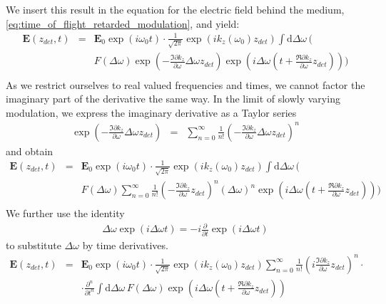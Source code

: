 \documentclass[12pt,a4paper,twoside,openright,BCOR10mm,headsepline,titlepage,abstracton,chapterprefix,final]{scrreprt}
\newcommand\Vector[1]{{\mathbf{#1}}}
\newcommand\wavenumber{k}
\newcommand\scalarEfield{E}
\newcommand\Efield{\Vector{\scalarEfield}}
\newcommand\totald{\textrm{d}}
\begin{document}
We insert this result in the equation for the electric field behind the medium, \eqref{eq:time_of_flight_retarded_modulation}, and yield:
\begin{eqnarray}
\Efield(z_{det}, t) &=& 
  \Efield_0 \exp ( i \omega_0 t)
  \cdot
     \frac{1}{\sqrt{2\pi}} \exp (i \wavenumber_z(\omega_0) z_{det})
     \int \totald\Delta\omega\,
     \Bigg( \nonumber\\&&
        F(\Delta \omega)
        \exp \left(- \frac{\Im \partial \wavenumber_z}{\partial \omega} \Delta \omega z_{det}\right)
        \exp \left( i \Delta \omega \left(t + \frac{\Re \partial \wavenumber_z}{\partial \omega} z_{det}\right)\right)
    \Bigg)
      \nonumber\\
\end{eqnarray}
As we restrict ourselves to real valued frequencies and times, 
we cannot factor the imaginary part of the derivative the same way.
In the limit of slowly varying modulation, we express the imaginary derivative as a Taylor series
\begin{eqnarray}
 \exp \left(- \frac{\Im \partial \wavenumber_z}{\partial \omega} \Delta \omega z_{det}\right)
 &=&
 \sum_{n=0}^{\infty}
 \frac{1}{n!}
 \left(- \frac{\Im \partial \wavenumber_z}{\partial \omega} \Delta \omega z_{det}\right)^n
\end{eqnarray}
and obtain
\begin{eqnarray}
\Efield(z_{det}, t) &=& 
  \Efield_0 \exp ( i \omega_0 t)
  \cdot
     \frac{1}{\sqrt{2\pi}} \exp (i \wavenumber_z(\omega_0) z_{det})
     \int \totald\Delta\omega\,
     \Bigg( \nonumber\\&&
        F(\Delta \omega)
          \sum_{n=0}^{\infty}
          \frac{1}{n!}
          \left(- \frac{\Im \partial \wavenumber_z}{\partial \omega} z_{det}\right)^n 
          (\Delta \omega)^n
        \exp \left( i \Delta \omega \left(t + \frac{\Re \partial \wavenumber_z}{\partial \omega} z_{det}\right)\right)
    \Bigg)
      \nonumber\\
\end{eqnarray}
We further use the identity
\begin{eqnarray}
 \Delta \omega \exp(i \Delta \omega t) = -i \frac{\partial}{\partial t} \exp(i \Delta \omega t)
\end{eqnarray}
to substitute $\Delta \omega$ by time derivatives.
\begin{eqnarray}
\Efield(z_{det}, t) &=& 
  \Efield_0 \exp ( i \omega_0 t)
  \cdot
     \frac{1}{\sqrt{2\pi}} \exp (i \wavenumber_z(\omega_0) z_{det})
     \sum_{n=0}^{\infty}
          \frac{1}{n!}
          \left(i \frac{\Im \partial \wavenumber_z}{\partial \omega} z_{det}\right)^n 
     \cdot \nonumber\\&& \cdot
     \frac{\partial^n}{\partial t^n}
     \int \totald\Delta\omega\,
        F(\Delta \omega)          
        \exp \left( i \Delta \omega \left(t + \frac{\Re \partial \wavenumber_z}{\partial \omega} z_{det}\right)\right)
\end{eqnarray}
\end{document}
